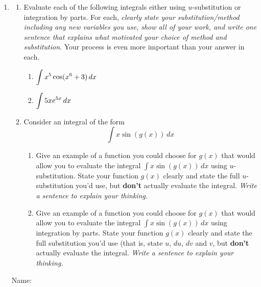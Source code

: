 \documentclass[11 pt]{article}
\newcommand{\ds}{\ensuremath{\displaystyle}}
\newcommand{\tr}{\vspace{0.5in}}
\newcommand{\lr}{\vspace{1.0in}}
\newcommand{\be}{\begin{enumerate}}
\newcommand{\ee}{\end{enumerate}}
\begin{document}
\begin{enumerate}

\item[4.] 

	\be
		\item Evaluate each of the following integrals either using $u$-substitution or integration by parts.  For each, \emph{clearly state your substitution/method including any new variables you use, show all of your work, and write one sentence that explains what motivated your choice of method and substitution}.  Your process is even more important than your answer in each.

			\be
			
				\item $\ds \int x^5 \cos(x^6 + 3) \, dx$
			
				\lr \tr
				
				\item $\ds \int 5x e^{5x} \, dx$
			
				\lr \tr
			\ee
	
		\item Consider an integral of the form
		$$\int x \sin(g(x)) \, dx$$

			\be
			
				\item	Give an example of a function you could choose for $g(x)$ that would allow you to evaluate the integral $\int x \sin(g(x)) \, dx$ using $u$-substitution.   State your function $g(x)$ clearly and state the full $u$-substitution you'd use, but {\bf don't} actually evaluate the integral.  \emph{Write a sentence to explain your thinking.}

					\lr
				
				\item Give an example of a function you could choose for $g(x)$ that would allow you to evaluate the integral $\int x \sin(g(x)) \, dx$ using integration by parts.   State your function $g(x)$ clearly and state the full substitution you'd use (that is, state $u$, $du$, $dv$ and $v$, but {\bf don't} actually evaluate the integral.  \emph{Write a sentence to explain your thinking.}
	

				

			\ee
	\ee
	
	\pagebreak


\noindent Name: \\ 



\end{enumerate}
\end{document}
